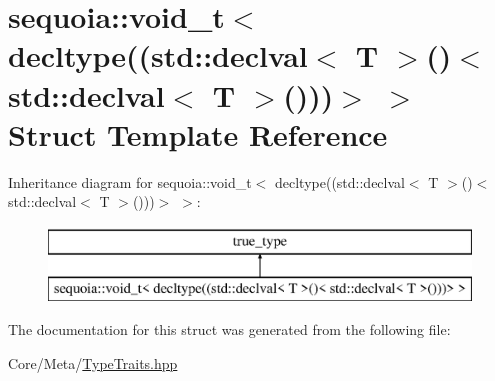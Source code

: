 \hypertarget{structsequoia_1_1is__orderable_3_01_t_00_01std_1_1void__t_3_01decltype_07_07std_1_1declval_3_01_0f03bdba07d0876f312f843f164b5a13}{}\section{sequoia\+::void\+\_\+t$<$ decltype((std\+::declval$<$ T $>$()$<$ std\+::declval$<$ T $>$()))$>$ $>$ Struct Template Reference}
\label{structsequoia_1_1is__orderable_3_01_t_00_01std_1_1void__t_3_01decltype_07_07std_1_1declval_3_01_0f03bdba07d0876f312f843f164b5a13}
Inheritance diagram for sequoia\+::void\+\_\+t$<$ decltype((std\+::declval$<$ T $>$()$<$ std\+::declval$<$ T $>$()))$>$ $>$\+:\begin{figure}[H]
\begin{center}
\leavevmode
\includegraphics[height=2.000000cm]{structsequoia_1_1is__orderable_3_01_t_00_01std_1_1void__t_3_01decltype_07_07std_1_1declval_3_01_0f03bdba07d0876f312f843f164b5a13}
\end{center}
\end{figure}


The documentation for this struct was generated from the following file\+:\begin{DoxyCompactItemize}
\item 
Core/\+Meta/\mbox{\hyperlink{_type_traits_8hpp}{Type\+Traits.\+hpp}}\end{DoxyCompactItemize}
